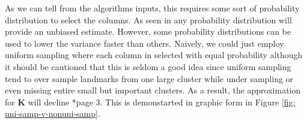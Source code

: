 As we can tell from the algorithms inputs, this requires some sort of probability distribution to select the columns. As seen in  any probability distribution will provide an unbiased estimate. However, some probability distributions can be used to lower the variance faster than others. Naively, we could just employ uniform sampling where each column in selected with equal probability although it should be cautioned that this is seldom a good idea since uniform sampling tend to over sample landmarks from one large cluster while under sampling or even missing entire small but important clusters. As a result, the approximation for $\bm{K}$ will decline \cite{musco2017recursive}*{page 3}. This is demonstarted in graphic form in Figure \ref{fig: uni-samp-v-nonuni-samp}.

\begin{figure}[h]
    \centering
     \qquad
\end{figure}
